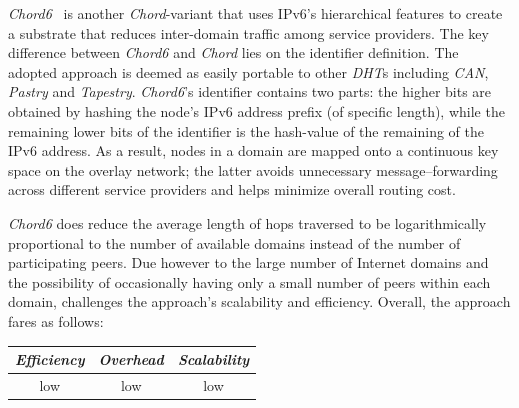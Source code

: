\emph{Chord6}~\cite{XZHL2005} is another \emph{Chord}-variant that
uses IPv6's  hierarchical features to create 
a substrate that reduces inter-domain traffic among service providers. 
The key difference between
\emph{Chord6} and \emph{Chord} lies on the identifier definition. 
The adopted approach is deemed as easily portable to other 
\emph{DHT}s including \emph{CAN}, \emph{Pastry} and \emph{Tapestry}. 
\emph{Chord6}'s identifier contains two parts: 
the higher bits are obtained by hashing the
node's IPv6 address prefix (of specific length), 
while the remaining lower bits of the identifier 
is the hash-value of the remaining of the IPv6 address. 
As a result, nodes in a domain are mapped 
onto a continuous key space on the overlay network;
the latter avoids unnecessary message--forwarding across different
service providers and helps minimize overall routing cost.

\emph{Chord6} does reduce the average 
length of hops traversed
to be logarithmically proportional to the number 
of available domains instead of the number of participating peers. 
Due however to the large number of Internet
domains and the possibility of occasionally having only 
a small number of peers within each domain,
\cite{DK2006} challenges the approach's scalability and efficiency.
Overall, the approach fares as follows:
\begin{center}
{\footnotesize
\begin{tabular}{ccc}
\emph{Efficiency} & \emph{Overhead} & \emph{Scalability} \\
\hline
low &
low &
low
\end{tabular}
}
\end{center}


